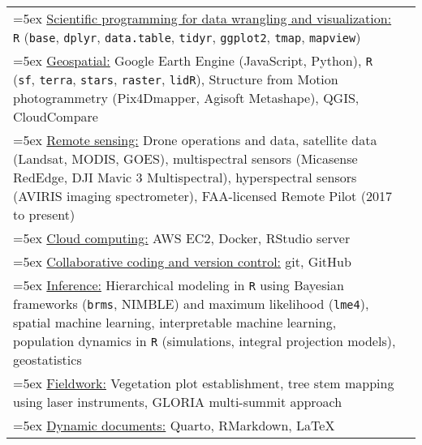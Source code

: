 \begin{longtable}{@{}>{\raggedright}p{6.25in} >{\raggedleft}X@{}}

\hangindent=5ex \underline{Scientific programming for data wrangling and visualization:} \texttt{R} (\texttt{base}, \texttt{dplyr}, \texttt{data.table}, \texttt{tidyr}, \texttt{ggplot2}, \texttt{tmap}, \texttt{mapview}) & \tabularnewline
\hangindent=5ex \underline{Geospatial:} Google Earth Engine (JavaScript, Python), \texttt{R} (\texttt{sf}, \texttt{terra}, \texttt{stars}, \texttt{raster},  \texttt{lidR}), Structure from Motion photogrammetry (Pix4Dmapper, Agisoft Metashape), QGIS, CloudCompare & \tabularnewline
\hangindent=5ex \underline{Remote sensing:} Drone operations and data, satellite data (Landsat, MODIS, GOES), multispectral sensors (Micasense RedEdge, DJI Mavic 3 Multispectral), hyperspectral sensors (AVIRIS imaging spectrometer), FAA-licensed Remote Pilot (2017 to present) & \tabularnewline
\hangindent=5ex \underline{Cloud computing:} AWS EC2, Docker, RStudio server & \tabularnewline
\hangindent=5ex \underline{Collaborative coding and version control:} git, GitHub & \tabularnewline
\hangindent=5ex \underline{Inference:} Hierarchical modeling in \texttt{R} using Bayesian frameworks (\texttt{brms}, NIMBLE) and maximum likelihood (\texttt{lme4}), spatial machine learning, interpretable machine learning, population dynamics in \texttt{R} (simulations, integral projection models), geostatistics & \tabularnewline
\hangindent=5ex \underline{Fieldwork:} Vegetation plot establishment, tree stem mapping using laser instruments, GLORIA multi-summit approach & \tabularnewline
\hangindent=5ex \underline{Dynamic documents:} Quarto, RMarkdown, \LaTeX{} & \tabularnewline

\end{longtable}